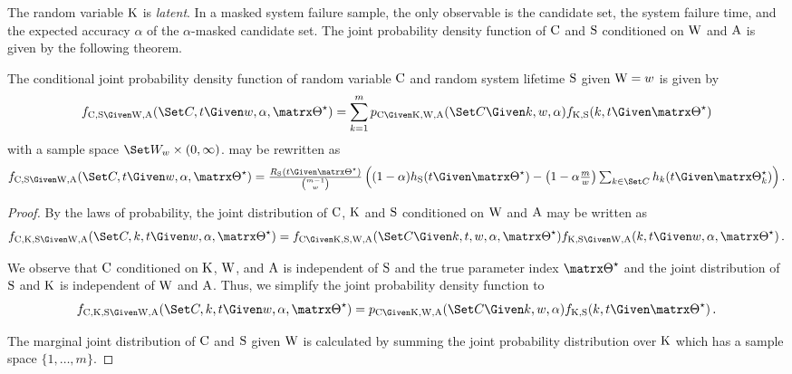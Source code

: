 \documentclass[../main.tex]{subfiles}
\begin{document}
The random variable $\mathrm{K}$ is \emph{latent}.
In a masked system failure sample, the only observable is the candidate set, the system failure time, and the expected accuracy $\alpha$ of the $\alpha$-masked candidate set.
The joint probability density function of $\mathrm{C}$ and $\mathrm{S}$ conditioned on $\mathrm{W}$ and $\mathrm{A}$ is given by the following theorem.
\begin{theorem}
The conditional joint probability density function of random variable $\mathrm{C}$ and random system lifetime $\mathrm{S}$ given $\mathrm{W} = w$ is given by
\begin{equation}
\label{eq:joint_alpha}
\pdf_{\rvcand,\sv \Given \RV{W}, \RV{A}}(\cand,t \Given w, \alpha, \tparam\sysparam) =
	\sum_{k=1}^{m} \pmf_{\rvcand \Given \RV{K}, \RV{W}, \RV{A}}(\cand \Given k, w, \alpha) \pdf_{\RV{K},\sv}(k,t \Given \tparam\sysparam)
\end{equation}
with a sample space $\candsw{w} \times (0,\infty)$.
 may be rewritten as
\begin{equation}
\label{eq:joint_alpha_2}
\mathsmaller{\pdf_{\rvcand,\sv \Given \RV{W}, \RV{A}}(\cand,t \Given w, \alpha, \tparam\sysparam) =
\frac{\srv_{\sv}(t \Given \tparam\sysparam)}{\binom{m-1}{w}}
\left(
	(1-\alpha) \haz_{\sv}(t \Given \tparam\sysparam) - \left(1-\alpha \frac{m}{w}\right) \sum_{k \in \cand} \haz_k(t \Given \tparam\sysparam_k)
\right)}\,.
\end{equation}
\end{theorem}
\begin{proof}
By the laws of probability, the joint distribution of $\mathrm{C}$, $\mathrm{K}$ and $\mathrm{S}$ conditioned on $\mathrm{W}$ and $\mathrm{A}$ may be written as
\begin{equation}
	\pdf_{\rvcand,\RV{K},\sv \Given \RV{W}, \RV{A}}(\cand,k,t \Given w, \alpha, \tparam\sysparam) = \pdf_{\rvcand \Given \RV{K}, \sv, \RV{W}, \RV{A}}(\cand \Given k, t, w, \alpha, \tparam\sysparam) \pdf_{\RV{K},\sv \Given \RV{W}, \RV{A}}(k,t \Given w, \alpha, \tparam\sysparam)\,.
\end{equation}

We observe that $\mathrm{C}$ conditioned on $\mathrm{K}$, $\mathrm{W}$, and $\mathrm{A}$ is independent of $\mathrm{S}$ and the true parameter index $\tparam\sysparam$ and the joint distribution of $\mathrm{S}$ and $\mathrm{K}$ is independent of $\mathrm{W}$ and $\mathrm{A}$.
Thus, we simplify the joint probability density function to
\begin{equation}
\pdf_{\rvcand,\RV{K},\sv \Given \RV{W}, \RV{A}}(\cand,k,t \Given w, \alpha, \tparam\sysparam) = \pmf_{\rvcand \Given \RV{K}, \RV{W}, \RV{A}}(\cand \Given k, w, \alpha) \pdf_{\RV{K},\sv}(k,t \Given \tparam\sysparam)\,.
\end{equation}

The marginal joint distribution of $\mathrm{C}$ and $\mathrm{S}$ given $\mathrm{W}$ is calculated by summing the joint probability distribution over $\mathrm{K}$ which has a sample space $\{1,\ldots,m\}$.
\end{proof}
\end{document}

